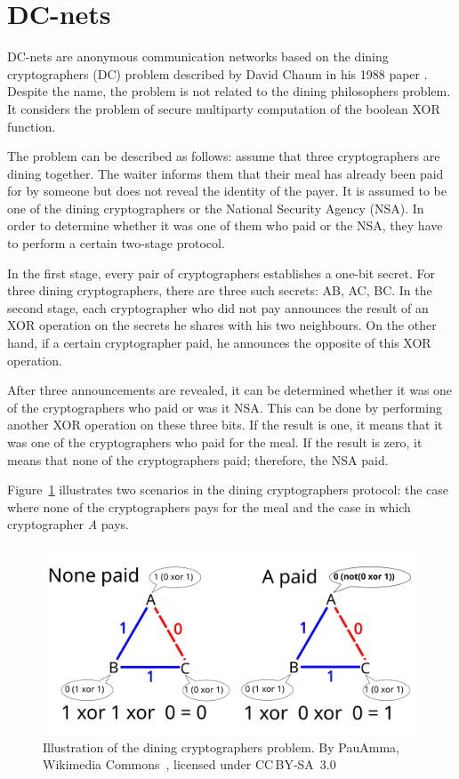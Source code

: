 \section{DC-nets}

DC-nets are anonymous communication networks based on the dining cryptographers (DC) problem described by David Chaum in his 1988 paper \cite{dc-nets}. Despite the name, the problem is not related to the dining philosophers problem. It considers the problem of secure multiparty computation of the boolean XOR function.

The problem can be described as follows: assume that three cryptographers are dining together. The waiter informs them that their meal has already been paid for by someone but does not reveal the identity of the payer. It is assumed to be one of the dining cryptographers or the National Security Agency (NSA). In order to determine whether it was one of them who paid or the NSA, they have to perform a certain two-stage protocol.

In the first stage, every pair of cryptographers establishes a one-bit secret. For three dining cryptographers, there are three such secrets: AB, AC, BC.
In the second stage, each cryptographer who did not pay announces the result of an XOR operation on the secrets he shares with his two neighbours. On the other hand, if a certain cryptographer paid, he announces the opposite of this XOR operation.

After three announcements are revealed, it can be determined whether it was one of the cryptographers who paid or was it NSA. This can be done by performing another XOR operation on these three bits. If the result is one, it means that it was one of the cryptographers who paid for the meal. If the result is zero, it means that none of the cryptographers paid; therefore, the NSA paid.

Figure~\ref{fig:dining_cryptographers} illustrates two scenarios in the dining cryptographers protocol: the case where none of the cryptographers pays for the meal and the case in which cryptographer \textit{A} pays.

\begin{figure}[ht]
  \centering
  \includegraphics[width=0.7\linewidth]{Images/dc.png}
  \caption{Illustration of the dining cryptographers problem. By PauAmma, Wikimedia Commons~\cite{dining_cryptographers_pauamma}, licensed under CC BY‑SA 3.0}
  \label{fig:dining_cryptographers}
\end{figure}

